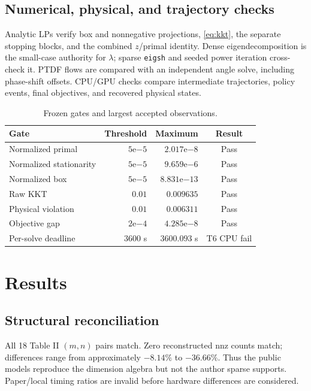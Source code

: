 \documentclass[10pt,journal]{IEEEtran}
\begin{document}
\subsection{Numerical, physical, and trajectory checks}

Analytic LPs verify box and nonnegative projections, \eqref{eq:kkt}, the
separate stopping blocks, and the combined $z$/primal identity. Dense
eigendecomposition is the small-case authority for $\lambda$; sparse
\texttt{eigsh} and seeded power iteration cross-check it. PTDF flows are
compared with an independent angle solve, including phase-shift offsets.
CPU/GPU checks compare intermediate trajectories, policy events, final
objectives, and recovered physical states.

\begin{table}[t]
\caption{Frozen gates and largest accepted observations.}
\label{tab:gates}
\centering
\scriptsize
\renewcommand{\arraystretch}{0.92}
\begin{tabular}{@{}lrrc@{}}
\toprule
Gate & Threshold & Maximum & Result \\
\midrule
Normalized primal & $5\mathrm{e}{-5}$ & $2.017\mathrm{e}{-8}$ & Pass \\
Normalized stationarity & $5\mathrm{e}{-5}$ & $9.659\mathrm{e}{-6}$ & Pass \\
Normalized box & $5\mathrm{e}{-5}$ & $8.831\mathrm{e}{-13}$ & Pass \\
Raw KKT & $0.01$ & $0.009635$ & Pass \\
Physical violation & $0.01$ & $0.006311$ & Pass \\
Objective gap & $2\mathrm{e}{-4}$ & $4.285\mathrm{e}{-8}$ & Pass \\
Per-solve deadline & $3600$ s & $3600.093$ s & T6 CPU fail \\
\bottomrule
\end{tabular}
\end{table}

\section{Results}

\subsection{Structural reconciliation}

All 18 Table II $(m,n)$ pairs match. Zero reconstructed nnz counts match;
differences range from approximately $-8.14\%$ to $-36.66\%$. Thus the
public models reproduce the dimension algebra but not the author sparse
supports. Paper/local timing ratios are invalid before hardware differences
are considered.
\end{document}
